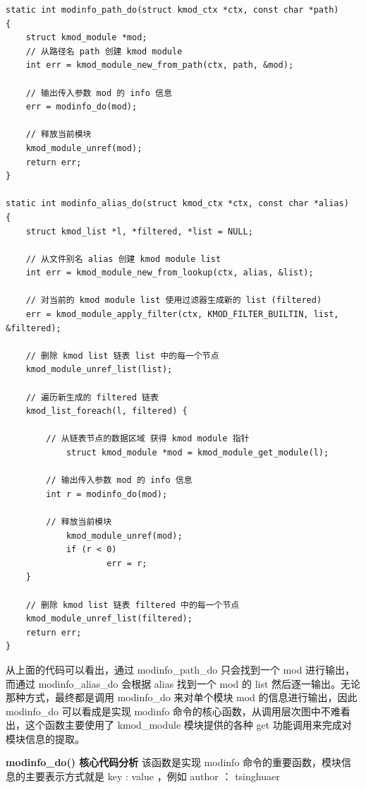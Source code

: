 {\begin{shaded}\begin{verbatim}
static int modinfo_path_do(struct kmod_ctx *ctx, const char *path)
{
    struct kmod_module *mod;
    // 从路径名 path 创建 kmod module
    int err = kmod_module_new_from_path(ctx, path, &mod);

    // 输出传入参数 mod 的 info 信息
    err = modinfo_do(mod);

    // 释放当前模块
    kmod_module_unref(mod);
    return err;
}

static int modinfo_alias_do(struct kmod_ctx *ctx, const char *alias)
{
    struct kmod_list *l, *filtered, *list = NULL;

    // 从文件别名 alias 创建 kmod module list
    int err = kmod_module_new_from_lookup(ctx, alias, &list);

    // 对当前的 kmod module list 使用过滤器生成新的 list (filtered)
    err = kmod_module_apply_filter(ctx, KMOD_FILTER_BUILTIN, list, &filtered);

    // 删除 kmod list 链表 list 中的每一个节点
    kmod_module_unref_list(list);

    // 遍历新生成的 filtered 链表
    kmod_list_foreach(l, filtered) {

        // 从链表节点的数据区域 获得 kmod module 指针
            struct kmod_module *mod = kmod_module_get_module(l);

        // 输出传入参数 mod 的 info 信息             
        int r = modinfo_do(mod);

        // 释放当前模块
            kmod_module_unref(mod);
            if (r < 0)
                    err = r;
    }

    // 删除 kmod list 链表 filtered 中的每一个节点
    kmod_module_unref_list(filtered);
    return err;
}
\end{verbatim}\end{shaded}}
从上面的代码可以看出，通过 modinfo\_path\_do 只会找到一个 mod
进行输出，而通过 modinfo\_alias\_do 会根据 alias 找到一个 mod 的 list
然后逐一输出。无论那种方式，最终都是调用 modinfo\_do 来对单个模块 mod
的信息进行输出，因此 modinfo\_do 可以看成是实现 modinfo
命令的核心函数，从调用层次图中不难看出，这个函数主要使用了 kmod\_module
模块提供的各种 get 功能调用来完成对模块信息的提取。

\textbf{modinfo\_do() 核心代码分析} 该函数是实现 modinfo
命令的重要函数，模块信息的主要表示方式就是 key : value ，例如 author ：
tsinghuaer

